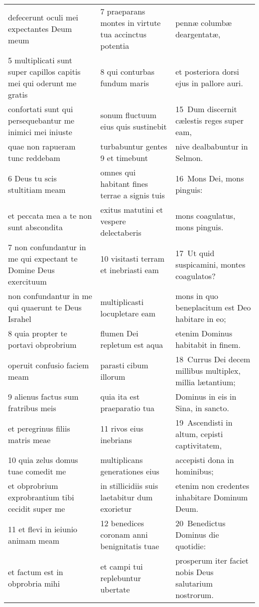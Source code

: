 \documentclass{article}
\begin{document}
\begin{longtable}{@{}p{}p{}p{}@{}}
defecerunt oculi mei expectantes Deum meum	&	7 praeparans montes in virtute tua accinctus potentia	&	pennæ columbæ deargentatæ,	\\
5 multiplicati sunt super capillos capitis mei qui oderunt me gratis	&	8 qui conturbas fundum maris	&	et posteriora dorsi ejus in pallore auri.	\\
confortati sunt qui persequebantur me inimici mei iniuste	&	sonum fluctuum eius quis sustinebit	&	15 Dum discernit cælestis reges super eam,	\\
quae non rapueram tunc reddebam	&	turbabuntur gentes 9 et timebunt	&	nive dealbabuntur in Selmon.	\\
6 Deus tu scis stultitiam meam	&	omnes qui habitant fines terrae a signis tuis	&	16 Mons Dei, mons pinguis:	\\
et peccata mea a te non sunt abscondita	&	exitus matutini et vespere delectaberis	&	mons coagulatus, mons pinguis.	\\
7 non confundantur in me qui expectant te Domine Deus exercituum	&	10 visitasti terram et inebriasti eam	&	17 Ut quid suspicamini, montes coagulatos?	\\
non confundantur in me qui quaerunt te Deus Israhel	&	multiplicasti locupletare eam	&	mons in quo beneplacitum est Deo habitare in eo;	\\
8 quia propter te portavi obprobrium	&	flumen Dei repletum est aqua	&	etenim Dominus habitabit in finem.	\\
operuit confusio faciem meam	&	parasti cibum illorum	&	18 Currus Dei decem millibus multiplex, millia lætantium;	\\
9 alienus factus sum fratribus meis	&	quia ita est praeparatio tua	&	Dominus in eis in Sina, in sancto.	\\
et peregrinus filiis matris meae	&	11 rivos eius inebrians	&	19 Ascendisti in altum, cepisti captivitatem,	\\
10 quia zelus domus tuae comedit me	&	multiplicans generationes eius	&	accepisti dona in hominibus;	\\
et obprobrium exprobrantium tibi cecidit super me	&	in stillicidiis suis laetabitur dum exorietur	&	etenim non credentes inhabitare Dominum Deum.	\\
11 et flevi in ieiunio animam meam	&	12 benedices coronam anni benignitatis tuae	&	20 Benedictus Dominus die quotidie:	\\
et factum est in obprobria mihi	&	et campi tui replebuntur ubertate	&	prosperum iter faciet nobis Deus salutarium nostrorum.	\\

\end{longtable}
\end{document}
